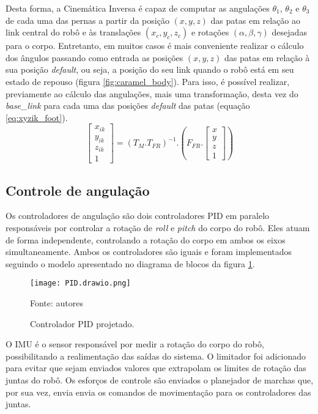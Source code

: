 \documentclass[../main.tex]{subfiles}
\begin{document}
Desta forma, a Cinemática Inversa é capaz de computar as angulações  $\theta_1$, $\theta_2$ e $\theta_3$ de cada uma das pernas a partir da posição $(x, y, z)$ das patas em relação ao link central do robô e às translações $(x_c, y_c, z_c)$ e rotações $(\alpha, \beta, \gamma)$ desejadas para o corpo. Entretanto, em muitos casos é mais conveniente realizar o cálculo dos ângulos passando como entrada as posições $(x, y, z)$ das patas em relação à sua posição \textit{default}, ou seja, a posição do seu link quando o robô está em seu estado de repouso (figura \ref{fig:caramel_body}). Para isso, é possível realizar, previamente ao cálculo das angulações, mais uma transformação, desta vez do \textit{base\_link} para cada uma das posições \textit{default} das patas (equação \ref{eq:xyzik_foot}).
\begin{equation}
  \label{eq:xyzik_foot}
  \begin{bmatrix}
    x_{ik} \\
    y_{ik} \\
    z_{ik} \\
    1
  \end{bmatrix}= (T_M.T_{FR})^{-1}.
  (F_{FR}.
  \begin{bmatrix}
    x \\
    y \\
    z \\
    1
  \end{bmatrix})
\end{equation}

\subsection{Controle de angulação}

Os controladores de angulação são dois controladores PID em paralelo responsáveis por controlar a rotação de \textit{roll} e \textit{pitch} do corpo do robô. Eles atuam de forma independente, controlando a rotação do corpo em ambos os eixos simultaneamente. Ambos os controladores são iguais e foram implementados seguindo o modelo apresentado no diagrama de blocos da figura \ref{fig:pid}.
\begin{figure}[!htb]
  \centering
  \caption{Controlador PID projetado.}
  \texttt{[image: PID.drawio.png]}

  Fonte: autores
  \label{fig:pid}
\end{figure}

O IMU é o sensor responsável por medir a rotação do corpo do robô, possibilitando a realimentação das saídas do sistema. O limitador foi adicionado para evitar que sejam enviados valores que extrapolam os limites de rotação das juntas do robô. Os esforços de controle são enviados o planejador de marchas que, por sua vez, envia envia os comandos de movimentação para os controladores das juntas.
\end{document}
